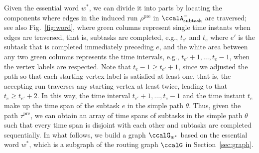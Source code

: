 \documentclass[Afour,sageh,times]{sagej}
\newcommand{\auto}[1]{\ccalA_{\textup{#1}}}
\begin{document}
{{Given the essential word $w^*$, we can divide it into parts by locating the components where edges in the induced run $\rho^\text{pre}$ in $\auto{subtask}^-$ are traversed; see also Fig.~\ref{fig:word}, where green columns represent single time instants when edges  are traversed, that is, subtasks are completed, e.g., $t_{e'}$ and $t_{e}$ where $e'$ is the subtask that is completed immediately preceding $e$, and the white area between any two green columns represents the time intervals, e.g., $t_{e'}+1, \ldots, t_{e}-1$, when the vertex labels are respected. Note that $t_{e}-1 \geq t_{e'}+1$, since we adjusted the path so that each starting vertex label is satisfied at least one, that is, the accepting run traverses any starting vertex at least twice, leading to that $t_{e} \geq t_{e'}+2$. In this way,  the time interval $t_{e'}+1, \ldots, t_{e}-1$ and the time instant $t_e$ make up the time span of the  subtask $e$ in the simple path $\theta$. Thus, given the path $\tau^\text{pre}$, we can obtain an array of time spans of subtasks in the simple path $\theta$ such that every time span is disjoint with each other and subtasks are completed sequentially. In what follows, we build a graph $\ccalG_{w^*}$ based on the essential word $w^*$, which is a subgraph of the routing graph $\ccalG$ in Section~\ref{sec:graph}.
}}
\end{document}
